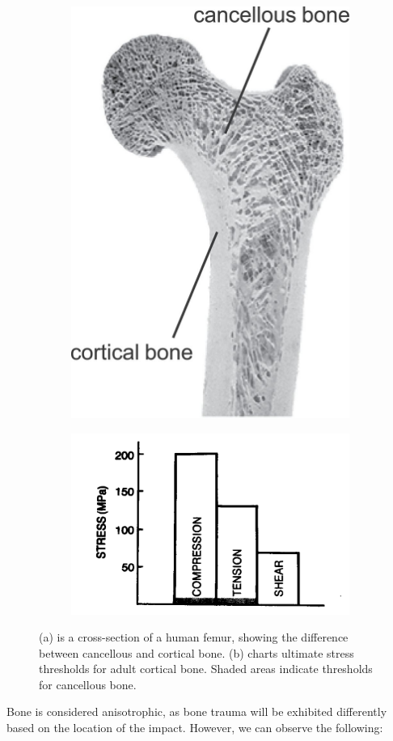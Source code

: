 \documentclass[titlepage]{article}
\begin{document}
\begin{figure}[h!]
\centering
\begin{subfigure}{.5\textwidth}
  \centering
  \includegraphics[width=.5\linewidth]{img/bone_microstructure}
  \end{subfigure}%
\begin{subfigure}{.5\textwidth}
  \centering
  \includegraphics[width=1.1\linewidth]{img/bone_stress}
  \caption{}
\end{subfigure}
\caption{(a) is a cross-section of a human femur, showing the difference between cancellous and cortical bone. (b) charts ultimate stress thresholds for adult cortical bone. Shaded areas indicate thresholds for cancellous bone.}
\label{fig:bone_struct}
\end{figure}

Bone is considered anisotrophic, as bone trauma will be exhibited differently based on the location of the impact. However, we can observe the following:
\end{document}
